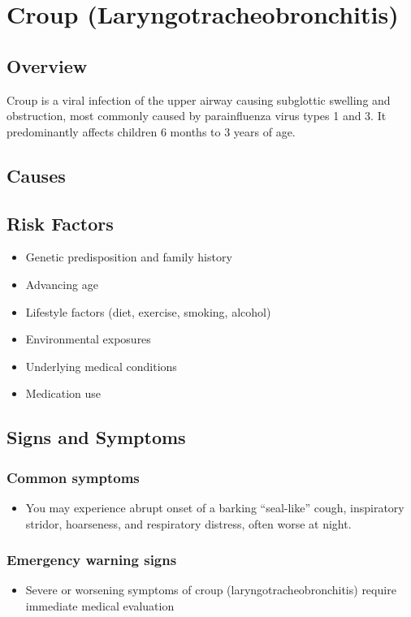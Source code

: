 \chapter{Croup (Laryngotracheobronchitis)}
\label{sec:Croup}

\section{Overview}
Croup is a viral infection of the upper airway causing subglottic swelling and obstruction, most commonly caused by parainfluenza virus types 1 and 3. It predominantly affects children 6 months to 3 years of age.
\section{Causes}
\section{Risk Factors}

\begin{itemize}[noitemsep]
  \item Genetic predisposition and family history
  \item Advancing age
  \item Lifestyle factors (diet, exercise, smoking, alcohol)
  \item Environmental exposures
  \item Underlying medical conditions
  \item Medication use
\end{itemize}
\section{Signs and Symptoms}

\subsection{Common symptoms}
\begin{itemize}[noitemsep]
  \item You may experience abrupt onset of a barking ``seal-like'' cough, inspiratory stridor, hoarseness, and respiratory distress, often worse at night. 
  \end{itemize}

\subsection{Emergency warning signs}
\begin{itemize}[noitemsep]
  \item Severe or worsening symptoms of croup (laryngotracheobronchitis) require immediate medical evaluation
\end{itemize}

